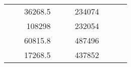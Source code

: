 \begin{table}[H]
\begin{tabular}{|ccrccrccc}
\multicolumn{1}{|c|}{\cellcolor[HTML]{FFFFC7}}                                & \multicolumn{1}{c|}{\cellcolor[HTML]{DAE8FC}}                      & \multicolumn{1}{r|}{\cellcolor[HTML]{DAE8FC}36268.5}   & \multicolumn{1}{c|}{\cellcolor[HTML]{FFFFC7}}                                & \multicolumn{1}{c|}{\cellcolor[HTML]{DAE8FC}}                       & \multicolumn{1}{r|}{\cellcolor[HTML]{DDFDFF}234074}    &                                                                              &                                                                    &                                                        \\ \cline{3-3} \cline{6-6}
\multicolumn{1}{|c|}{\cellcolor[HTML]{FFFFC7}}                                & \multicolumn{1}{c|}{\cellcolor[HTML]{DAE8FC}}                      & \multicolumn{1}{r|}{\cellcolor[HTML]{DDFDFF}108298}    & \multicolumn{1}{c|}{\cellcolor[HTML]{FFFFC7}}                                & \multicolumn{1}{c|}{\cellcolor[HTML]{DAE8FC}}                       & \multicolumn{1}{r|}{\cellcolor[HTML]{DAE8FC}232054}    &                                                                              &                                                                    &                                                        \\ \cline{3-3} \cline{6-6}
\multicolumn{1}{|c|}{\cellcolor[HTML]{FFFFC7}}                                & \multicolumn{1}{c|}{\cellcolor[HTML]{DAE8FC}}                      & \multicolumn{1}{r|}{\cellcolor[HTML]{DAE8FC}60815.8}   & \multicolumn{1}{c|}{\cellcolor[HTML]{FFFFC7}}                                & \multicolumn{1}{c|}{\cellcolor[HTML]{DAE8FC}}                       & \multicolumn{1}{r|}{\cellcolor[HTML]{DDFDFF}487496}    &                                                                              &                                                                    &                                                        \\ \cline{3-3} \cline{6-6}
\multicolumn{1}{|c|}{\cellcolor[HTML]{FFFFC7}}                                & \multicolumn{1}{c|}{\cellcolor[HTML]{DAE8FC}}                      & \multicolumn{1}{r|}{\cellcolor[HTML]{DDFDFF}17268.5}   & \multicolumn{1}{c|}{\cellcolor[HTML]{FFFFC7}}                                & \multicolumn{1}{c|}{\cellcolor[HTML]{DAE8FC}}                       & \multicolumn{1}{r|}{\cellcolor[HTML]{DAE8FC}437852}    &                                                                              &                                                                    &                                                        \\ \cline{3-3} \cline{6-6}

\end{tabular}
\end{table}
